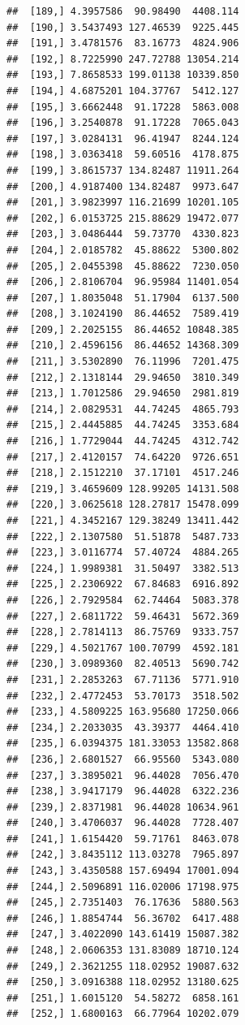 \documentclass[article]{jss}\usepackage[]{graphicx}\usepackage[]{xcolor}
\makeatletter
\newenvironment{kframe}{%
 \def\at@end@of@kframe{}%
 \ifinner\ifhmode%
  \def\at@end@of@kframe{\end{minipage}}%
  \begin{minipage}{\columnwidth}%
 \fi\fi%
 \def\FrameCommand##1{\hskip\@totalleftmargin \hskip-\fboxsep
 \colorbox{shadecolor}{##1}\hskip-\fboxsep
     \hskip-\linewidth \hskip-\@totalleftmargin \hskip\columnwidth}%
 \MakeFramed {\advance\hsize-\width
   \@totalleftmargin\z@ \linewidth\hsize
   \@setminipage}}%
 {\par\unskip\endMakeFramed%
 \at@end@of@kframe}
\newenvironment{knitrout}{}{} %
\makeatother
\begin{document}
\begin{knitrout}
\begin{kframe}
\begin{verbatim}
##  [189,] 4.3957586  90.98490  4408.114
##  [190,] 3.5437493 127.46539  9225.445
##  [191,] 3.4781576  83.16773  4824.906
##  [192,] 8.7225990 247.72788 13054.214
##  [193,] 7.8658533 199.01138 10339.850
##  [194,] 4.6875201 104.37767  5412.127
##  [195,] 3.6662448  91.17228  5863.008
##  [196,] 3.2540878  91.17228  7065.043
##  [197,] 3.0284131  96.41947  8244.124
##  [198,] 3.0363418  59.60516  4178.875
##  [199,] 3.8615737 134.82487 11911.264
##  [200,] 4.9187400 134.82487  9973.647
##  [201,] 3.9823997 116.21699 10201.105
##  [202,] 6.0153725 215.88629 19472.077
##  [203,] 3.0486444  59.73770  4330.823
##  [204,] 2.0185782  45.88622  5300.802
##  [205,] 2.0455398  45.88622  7230.050
##  [206,] 2.8106704  96.95984 11401.054
##  [207,] 1.8035048  51.17904  6137.500
##  [208,] 3.1024190  86.44652  7589.419
##  [209,] 2.2025155  86.44652 10848.385
##  [210,] 2.4596156  86.44652 14368.309
##  [211,] 3.5302890  76.11996  7201.475
##  [212,] 2.1318144  29.94650  3810.349
##  [213,] 1.7012586  29.94650  2981.819
##  [214,] 2.0829531  44.74245  4865.793
##  [215,] 2.4445885  44.74245  3353.684
##  [216,] 1.7729044  44.74245  4312.742
##  [217,] 2.4120157  74.64220  9726.651
##  [218,] 2.1512210  37.17101  4517.246
##  [219,] 3.4659609 128.99205 14131.508
##  [220,] 3.0625618 128.27817 15478.099
##  [221,] 4.3452167 129.38249 13411.442
##  [222,] 2.1307580  51.51878  5487.733
##  [223,] 3.0116774  57.40724  4884.265
##  [224,] 1.9989381  31.50497  3382.513
##  [225,] 2.2306922  67.84683  6916.892
##  [226,] 2.7929584  62.74464  5083.378
##  [227,] 2.6811722  59.46431  5672.369
##  [228,] 2.7814113  86.75769  9333.757
##  [229,] 4.5021767 100.70799  4592.181
##  [230,] 3.0989360  82.40513  5690.742
##  [231,] 2.2853263  67.71136  5771.910
##  [232,] 2.4772453  53.70173  3518.502
##  [233,] 4.5809225 163.95680 17250.066
##  [234,] 2.2033035  43.39377  4464.410
##  [235,] 6.0394375 181.33053 13582.868
##  [236,] 2.6801527  66.95560  5343.080
##  [237,] 3.3895021  96.44028  7056.470
##  [238,] 3.9417179  96.44028  6322.236
##  [239,] 2.8371981  96.44028 10634.961
##  [240,] 3.4706037  96.44028  7728.407
##  [241,] 1.6154420  59.71761  8463.078
##  [242,] 3.8435112 113.03278  7965.897
##  [243,] 3.4350588 157.69494 17001.094
##  [244,] 2.5096891 116.02006 17198.975
##  [245,] 2.7351403  76.17636  5880.563
##  [246,] 1.8854744  56.36702  6417.488
##  [247,] 3.4022090 143.61419 15087.382
##  [248,] 2.0606353 131.83089 18710.124
##  [249,] 2.3621255 118.02952 19087.632
##  [250,] 3.0916388 118.02952 13180.625
##  [251,] 1.6015120  54.58272  6858.161
##  [252,] 1.6800163  66.77964 10202.079

\end{verbatim}
\end{kframe}
\end{knitrout}
\end{document}
